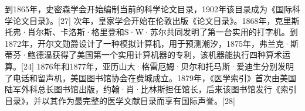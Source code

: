 到1865年，史密森学会开始编制当前的科学论文目录，1902年该目录成为《国际科学论文目录》。[27] 次年，皇家学会开始在伦敦出版《论文目录》。1868年，克里斯托弗·肖尔斯、卡洛斯·格里登和S·W·苏尔共同发明了第一台实用的打字机。到1872年，开尔文勋爵设计了一种模拟计算机，用于预测潮汐，1875年，弗兰克·斯蒂芬·鲍德温获得了美国第一个实用计算机器的专利，该机器能执行四种算术运算。[24] 1876年和1877年，亚历山大·格雷厄姆·贝尔和托马斯·爱迪生分别发明了电话和留声机，美国图书馆协会在费城成立。1879年，《医学索引》首次由美国陆军外科总长图书馆出版，约翰·肖·比林斯担任馆长，后来该图书馆发行《索引目录》，并以其作为最完整的医学文献目录而享有国际声誉。[28]